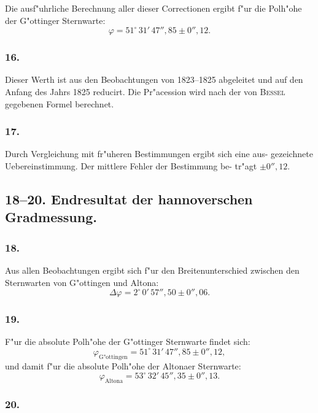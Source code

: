 \documentclass[12pt,a4paper]{article}
\theoremstyle{plain}
\theoremstyle{definition}
\theoremstyle{remark}
\begin{document}
Die ausf"uhrliche Berechnung aller dieser Correctionen ergibt f"ur die
Polh"ohe der G"ottinger Sternwarte:
\[
\varphi = 51^\circ\,31'\,47''{,}85 \pm 0''{,}12.
\]

\subsubsection*{16.}

Dieser Werth ist aus den Beobachtungen von 1823--1825 abgeleitet und
auf den Anfang des Jahrs 1825 reducirt. Die Pr"acession wird nach der
von \textsc{Bessel} gegebenen Formel berechnet.

\subsubsection*{17.}

Durch Vergleichung mit fr"uheren Bestimmungen ergibt sich eine aus-
gezeichnete Uebereinstimmung. Der mittlere Fehler der Bestimmung be-
tr"agt $\pm 0''{,}12$.

\subsection*{18--20. Endresultat der hannoverschen Gradmessung.}

\subsubsection*{18.}

Aus allen Beobachtungen ergibt sich f"ur den Breitenunterschied zwischen
den Sternwarten von G"ottingen und Altona:
\[
\Delta\varphi = 2^\circ\,0'\,57''{,}50 \pm 0''{,}06.
\]

\subsubsection*{19.}

F"ur die absolute Polh"ohe der G"ottinger Sternwarte findet sich:
\[
\varphi_{\text{G"ottingen}} = 51^\circ\,31'\,47''{,}85 \pm 0''{,}12,
\]
und damit f"ur die absolute Polh"ohe der Altonaer Sternwarte:
\[
\varphi_{\text{Altona}} = 53^\circ\,32'\,45''{,}35 \pm 0''{,}13.
\]

\subsubsection*{20.}
\end{document}
